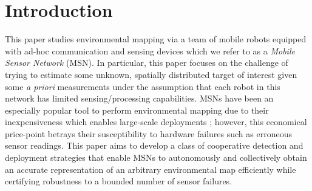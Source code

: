 \documentclass[letterpaper, 10 pt, conference]{ieeeconf}
\begin{document}
%
\IEEEpeerreviewmaketitle


\section{Introduction}
\label{sec:sec1}




This paper studies environmental mapping via a team of mobile robots equipped with ad-hoc communication and sensing devices which we refer to as a \emph{Mobile Sensor Network} (MSN).
In particular, this paper focuses on the challenge of trying to estimate some unknown, spatially distributed target of interest given some \textit{a priori} measurements under the assumption that each robot in this network has limited sensing/processing capabilities.
MSNs have been an especially popular tool to perform environmental mapping due to their inexpensiveness which enables large-scale deployments \cite{connor2016airborne,schwager2017multi,cortez2011information,pahlajani2014networked,julian2012distributed,julian2014mutual,lynch2008decentralized}; however, this economical price-point betrays their susceptibility to hardware failures such as erroneous sensor readings.
This paper aims to develop a class of cooperative detection and deployment strategies that enable MSNs to autonomously and collectively obtain an accurate representation of an arbitrary environmental map efficiently while certifying robustness to a bounded number of sensor failures. 

\end{document}
